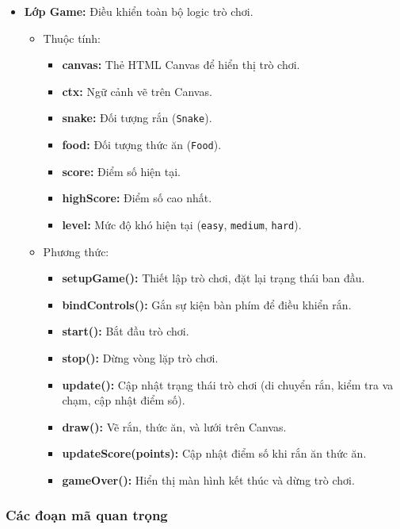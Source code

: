 \documentclass[a4paper, 12pt]{article}
\begin{document}
\begin{itemize}
    \item \textbf{Lớp Game:} Điều khiển toàn bộ logic trò chơi.
    \begin{itemize}
        \item Thuộc tính:
        \begin{itemize}
            \item \textbf{canvas:} Thẻ HTML Canvas để hiển thị trò chơi.
            \item \textbf{ctx:} Ngữ cảnh vẽ trên Canvas.
            \item \textbf{snake:} Đối tượng rắn (\texttt{Snake}).
            \item \textbf{food:} Đối tượng thức ăn (\texttt{Food}).
            \item \textbf{score:} Điểm số hiện tại.
            \item \textbf{highScore:} Điểm số cao nhất.
            \item \textbf{level:} Mức độ khó hiện tại (\texttt{easy}, \texttt{medium}, \texttt{hard}).
        \end{itemize}
        \item Phương thức:
        \begin{itemize}
            \item \textbf{setupGame():} Thiết lập trò chơi, đặt lại trạng thái ban đầu.
            \item \textbf{bindControls():} Gắn sự kiện bàn phím để điều khiển rắn.
            \item \textbf{start():} Bắt đầu trò chơi.
            \item \textbf{stop():} Dừng vòng lặp trò chơi.
            \item \textbf{update():} Cập nhật trạng thái trò chơi (di chuyển rắn, kiểm tra va chạm, cập nhật điểm số).
            \item \textbf{draw():} Vẽ rắn, thức ăn, và lưới trên Canvas.
            \item \textbf{updateScore(points):} Cập nhật điểm số khi rắn ăn thức ăn.
            \item \textbf{gameOver():} Hiển thị màn hình kết thúc và dừng trò chơi.
        \end{itemize}
    \end{itemize}
\end{itemize}

\subsubsection{Các đoạn mã quan trọng}
\end{document}
